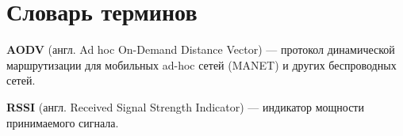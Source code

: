 \chapter*{Словарь терминов}             %

\textbf{AODV} (англ. Ad hoc On-Demand Distance Vector) --- протокол динамической маршрутизации для мобильных ad-hoc сетей (MANET) и других беспроводных сетей.

\textbf{RSSI} (англ. Received Signal Strength Indicator) --- индикатор мощности принимаемого сигнала.

